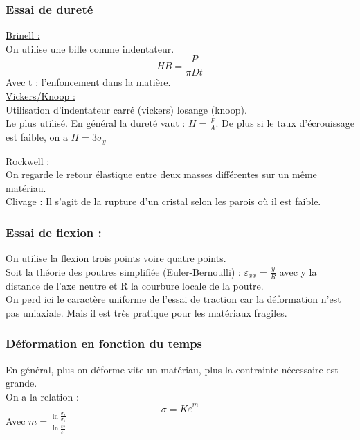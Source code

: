 \documentclass[../main.tex]{subfiles}
\begin{document}
\subsubsection{Essai de dureté}

\quad \underline{Brinell :}\\
On utilise une bille comme indentateur. \\
\begin{equation}
    HB = \frac{P}{\pi D t}
\end{equation}
Avec t : l'enfoncement dans la matière.\\

\quad \underline{Vickers/Knoop :}\\
Utilisation d'indentateur carré (vickers) losange (knoop).\\
Le plus utilisé. En général la dureté vaut : $H = \frac{F}{A}$. De plus si le taux d'écrouissage est faible, on a $ H = 3 \sigma_y$


\quad \underline{Rockwell :}\\
On regarde le retour élastique entre deux masses différentes sur un même matériau.\\

\quad \underline{Clivage :} Il s'agit de la rupture d'un cristal selon les parois où il est faible.\\

\subsubsection{Essai de flexion :}
On utilise la flexion trois points voire quatre points.\\
Soit la théorie des poutres simplifiée (Euler-Bernoulli) : $\varepsilon_{xx} = \frac{y}{R}$ avec y la distance de l'axe neutre et R la courbure locale de la poutre.\\

On perd ici le caractère uniforme de l'essai de traction car la déformation n'est pas uniaxiale. Mais il est très pratique pour les matériaux fragiles.

\subsubsection{Déformation en fonction du temps}
En général, plus on déforme vite un matériau, plus la contrainte nécessaire est grande.\\
On a la relation :\\
\begin{equation}
    \sigma = K \dot{\varepsilon}^m
\end{equation}
Avec $m=\frac{\ln{\frac{\sigma_2}{\sigma_1}}}{\ln{\frac{\dot{\varepsilon_2}}{\dot{\varepsilon_1}}}}$
\end{document}

